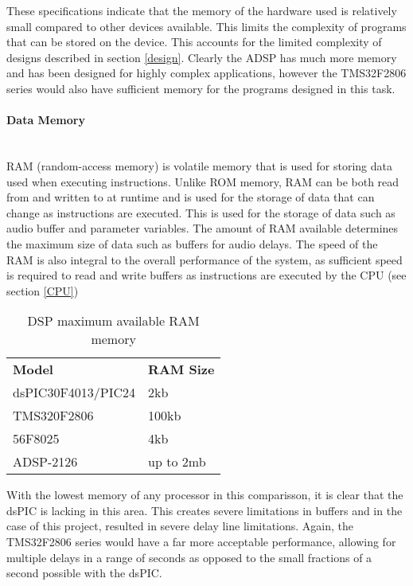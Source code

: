 \documentclass[titlepage]{scrartcl}
\begin{document}
    These specifications indicate that the memory of the hardware used is
    relatively small compared to other devices available. This limits the
    complexity of programs that can be stored on the device. This accounts for
    the limited complexity of designs described in section \ref{design}.
    Clearly the ADSP has much more memory and has been designed for highly
    complex applications, however the TMS32F2806 series would also have
    sufficient memory for the programs designed in this task.


    \paragraph{Data Memory}~\\
    RAM (random-access memory) is volatile memory that is used for storing data
    used when executing instructions. Unlike ROM memory, RAM can be both read
    from and written to at runtime and is used for the storage of data that can
    change as instructions are executed. This is used for the storage of data
    such as audio buffer and parameter variables. The amount of RAM available
    determines the maximum size of data such as buffers for audio delays. The
    speed of the RAM is also integral to the overall performance of the system,
    as sufficient speed is required to read and write buffers as instructions
    are executed by the CPU (see section \ref{CPU})

    \begin{table}[H]
    \centering
    \caption{DSP maximum available RAM memory}
    \label{my-label}
    \begin{tabular}{ll}
        \textbf{Model}     & \textbf{RAM Size}\\
        dsPIC30F4013/PIC24 & 2kb      \\
        TMS320F2806        & 100kb     \\
        56F8025            & 4kb      \\
        ADSP-2126          & up to 2mb
    \end{tabular}
    \end{table}

    With the lowest memory of any processor in this comparisson, it is clear
    that the dsPIC is lacking in this area. This creates severe limitations in
    buffers and in the case of this project, resulted in severe delay line
    limitations. Again, the TMS32F2806 series would have a far more acceptable
    performance, allowing for multiple delays in a range of seconds as opposed
    to the small fractions of a second possible with the dsPIC.
\end{document}
